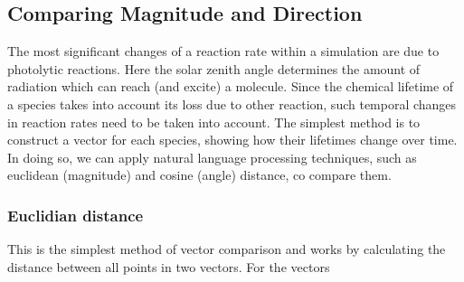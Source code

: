 


  \subsection{Comparing Magnitude and Direction}
The most significant changes of a reaction rate within a simulation are due to photolytic reactions. Here the solar zenith angle determines the amount of radiation which can reach (and excite) a molecule. Since the chemical lifetime of a species takes into account its loss due to other reaction, such temporal changes in reaction rates need to be taken into account. The simplest method is to construct a vector for each species, showing how their lifetimes change over time. In doing so, we can apply natural language processing techniques, such as euclidean (magnitude) and cosine (angle) distance, co compare them.

  \subsubsection{Euclidian distance} \label{sec:euclid}
  This is the simplest method of vector comparison and works by calculating the distance between all points in two vectors. For the vectors

